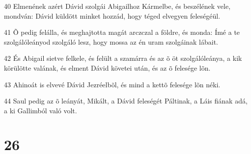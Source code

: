 \par 40 Elmenének azért Dávid szolgái Abigailhoz Kármelbe, és beszélének vele, mondván: Dávid küldött minket hozzád, hogy téged elvegyen feleségéül.
\par 41 Õ pedig felálla, és meghajtotta magát arczczal a földre, és monda: Ímé a te szolgálóleányod szolgáló lesz, hogy mossa az én uram szolgáinak lábait.
\par 42 És Abigail sietve felkele, és felült a szamárra és az õ öt szolgálóleánya, a kik körülötte valának, és elment Dávid követei után, és az õ felesége lõn.
\par 43 Ahinoát is elvevé Dávid Jezréelbõl, és mind a kettõ felesége lõn néki.
\par 44 Saul pedig az õ leányát, Mikált, a Dávid feleségét Páltinak, a Láis fiának adá, a ki Gallimból  való volt.

\chapter{26}

